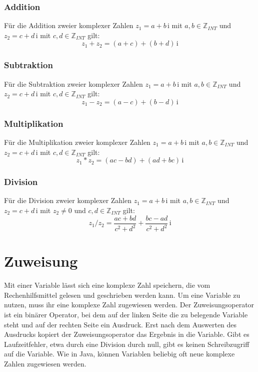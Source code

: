 \documentclass{sdqassignment}
\begin{document}
\subsubsection{Addition \lstinlinetxt{+}}
Für die Addition zweier komplexer Zahlen \(z_{1}=a+b\,\mathrm{i}\) mit \(a,b\in\mathbb{Z}_{INT}\) und \(z_{2}=c+d\,\mathrm{i}\) mit \(c,d\in\mathbb{Z}_{INT}\) gilt: \[z_{1}+z_{2}=(a+c)+(b+d)\,\mathrm{i}\]

\subsubsection{Subtraktion \lstinlinetxt{-}}
Für die Subtraktion zweier komplexer Zahlen \(z_{1}=a+b\,\mathrm{i}\) mit \(a,b\in\mathbb{Z}_{INT}\) und \(z_{2}=c+d\,\mathrm{i}\) mit \(c,d\in\mathbb{Z}_{INT}\) gilt: \[z_{1}-z_{2}=(a-c)+(b-d)\,\mathrm{i}\]

\subsubsection{Multiplikation \lstinlinetxt{*}}
Für die Multiplikation zweier komplexer Zahlen \(z_{1}=a+b\,\mathrm{i}\) mit \(a,b\in\mathbb{Z}_{INT}\) und \(z_{2}=c+d\,\mathrm{i}\) mit \(c,d\in\mathbb{Z}_{INT}\) gilt: \[z_{1} * z_{2}=(ac-bd)+(ad+bc)\,\mathrm{i}\]

\subsubsection{Division \lstinlinetxt{/}}
Für die Division zweier komplexer Zahlen \(z_{1}=a+b\,\mathrm{i}\) mit \(a,b\in\mathbb{Z}_{INT}\) und \(z_{2}=c+d\,\mathrm{i}\) mit \(z_{2}\neq 0\) und \(c,d\in\mathbb{Z}_{INT}\) gilt: \[z_{1} / z_{2}=\frac{ac+bd}{c^{2}+d^{2}}+\frac{bc-ad}{c^{2}+d^{2}}\,\mathrm{i}\]

\section{Zuweisung \lstinlinetxt{=}}
Mit einer Variable lässt sich eine komplexe Zahl speichern, die vom Rechenhilfsmittel gelesen und geschrieben werden kann. Um eine Variable zu nutzen, muss ihr eine komplexe Zahl zugewiesen werden. Der Zuweisungsoperator \lstinlinetxt{=} ist ein binärer Operator, bei dem auf der linken Seite die zu belegende Variable steht und auf der rechten Seite ein Ausdruck. Erst nach dem Auswerten des Ausdrucks kopiert der Zuweisungsoperator das Ergebnis in die Variable. Gibt es Laufzeitfehler, etwa durch eine Division durch null, gibt es keinen Schreibzugriff auf die Variable. Wie in Java, können Variablen beliebig oft neue komplexe Zahlen zugewiesen werden. %
\end{document}
